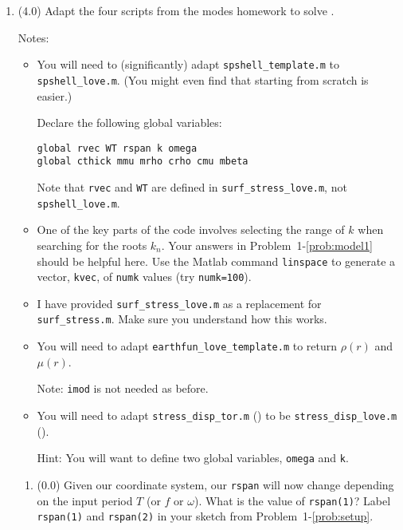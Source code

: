 \documentclass[11pt,titlepage,fleqn]{article}
\begin{document}

\begin{enumerate}

\item (4.0) Adapt the four scripts from the modes homework to solve .

Notes:
%
\begin{itemize}
\item You will need to (significantly) adapt \verb+spshell_template.m+ to \verb+spshell_love.m+. (You might even find that starting from scratch is easier.)

Declare the following global variables:
%
\begin{verbatim}
global rvec WT rspan k omega
global cthick mmu mrho crho cmu mbeta
\end{verbatim}
%
Note that \verb+rvec+ and \verb+WT+ are defined in \verb+surf_stress_love.m+, not \verb+spshell_love.m+.

\item One of the key parts of the code involves selecting the range of $k$ when searching for the roots $k_n$.
Your answers in Problem~1-\ref{prob:model1} should be helpful here.
Use the Matlab command \verb+linspace+ to generate a vector, \verb+kvec+, of \verb+numk+ values (try \verb+numk=100+).

\item I have provided \verb+surf_stress_love.m+ as a replacement for \verb+surf_stress.m+. Make sure you understand how this works.

\item You will need to adapt \verb+earthfun_love_template.m+ to return $\rho(r)$ and $\mu(r)$.

Note: \verb+imod+ is not needed as before.

\item You will need to adapt \verb+stress_disp_tor.m+ () to be \verb+stress_disp_love.m+ ().

Hint: You will want to define two global variables, \verb+omega+ and \verb+k+.

\end{itemize}

\begin{enumerate}
\item (0.0) Given our coordinate system, our \verb+rspan+ will now change depending on the input period $T$ (or $f$ or $\omega$). What is the value of \verb+rspan(1)+? Label \verb+rspan(1)+ and \verb+rspan(2)+ in your sketch from Problem~1-\ref{prob:setup}.


\end{enumerate}
\end{enumerate}
\end{document}
